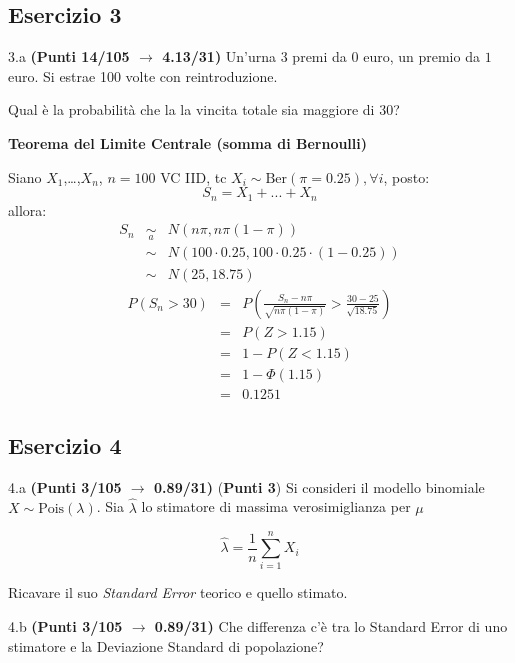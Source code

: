 \documentclass[
  11pt,
]{book}
\theoremstyle{mytheoremstyle}
\theoremstyle{mydefstyle}
\newenvironment{sol}
  {
  \begin{tcolorbox}[enhanced,breakable,arc=0.1mm,boxrule=1pt,colback=white,colframe=iblue,
  title=\bf \fontfamily{lmss}\selectfont \hspace{.5 cm} Soluzione,drop fuzzy shadow]

}{
\end{tcolorbox}
  }
\begin{document}
\subsection{Esercizio 3}\label{esercizio-3-38}

3.a \textbf{(Punti 14/105 \(\rightarrow\) 4.13/31)} Un'urna 3 premi da \(\mbox{0}\) euro, un premio da \(\mbox{1}\) euro.
Si estrae 100 volte con reintroduzione.

Qual è la probabilità che la la vincita totale sia maggiore di 30?

\begin{sol}
\textbf{Teorema del Limite Centrale (somma di Bernoulli)}

Siano \(X_1\),\ldots,\(X_n\), \(n=100\) VC IID, tc \(X_i\sim\text{Ber}(\pi=0.25)\)\(,\forall i\), posto:
\[
      S_n = X_1 + ... + X_n
      \]
allora:\begin{eqnarray*}
  S_n & \mathop{\sim}\limits_{a}& N(n\pi,n\pi(1-\pi)) \\
      &\sim & N(100\cdot0.25,100\cdot0.25\cdot(1-0.25)) \\
      &\sim & N(25,18.75)
  \end{eqnarray*}\begin{eqnarray*}
      P( S_n   >   30 ) 
        &=& P\left(  \frac { S_n  -  n\pi }{ \sqrt{n\pi(1-\pi)} }  >  \frac { 30  -  25 }{\sqrt{ 18.75 }} \right)  \\
                 &=& P\left(  Z   >   1.15 \right) \\    &=& 1-P(Z< 1.15 )\\ 
                 &=&  1-\Phi( 1.15 ) \\ &=&  0.1251 
      \end{eqnarray*}

\end{sol}

\subsection{Esercizio 4}\label{esercizio-4-38}

4.a \textbf{(Punti 3/105 \(\rightarrow\) 0.89/31)} (\textbf{Punti 3}) Si consideri il modello binomiale \(X\sim\text{Pois}(\lambda)\). Sia \(\hat\lambda\) lo stimatore di massima verosimiglianza per \(\mu\)

\[
  \hat\lambda = \frac 1n \sum_{i=1}^n X_i
\]

Ricavare il suo \emph{Standard Error} teorico e quello stimato.

4.b \textbf{(Punti 3/105 \(\rightarrow\) 0.89/31)} Che differenza c'è tra lo Standard Error di uno stimatore e la Deviazione Standard di popolazione?
\end{document}
